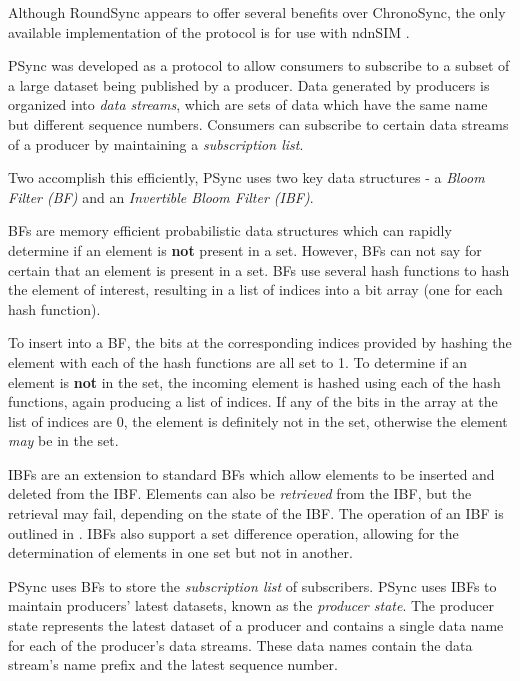 Although RoundSync appears to offer several benefits over ChronoSync, the only available implementation of the protocol is for use with ndnSIM \cite{roundsync-github}.

PSync was developed as a protocol to allow consumers to subscribe to a subset of a large dataset being published by a producer. Data generated by producers is organized into \textit{data streams}, which are sets of data which have the same name but different sequence numbers. Consumers can subscribe to certain data streams of a producer by maintaining a \textit{subscription list}.

Two accomplish this efficiently, PSync uses two key data structures - a \textit{Bloom Filter (BF)} and an \textit{Invertible Bloom Filter (IBF)}. 

BFs are memory efficient probabilistic data structures which can rapidly determine if an element is \textbf{not} present in a set. However, BFs can not say for certain that an element is present in a set. BFs use several hash functions to hash the element of interest, resulting in a list of indices into a bit array (one for each hash function). 

To insert into a BF, the bits at the corresponding indices provided by hashing the element with each of the hash functions are all set to 1. To determine if an element is \textbf{not} in the set, the incoming element is hashed using each of the hash functions, again producing a list of indices. If any of the bits in the array at the list of indices are 0, the element is definitely not in the set, otherwise the element \textit{may} be in the set. 

IBFs are an extension to standard BFs which allow elements to be inserted and deleted from the IBF. Elements can also be \textit{retrieved} from the IBF, but the retrieval may fail, depending on the state of the IBF. The operation of an IBF is outlined in . IBFs also support a set difference operation, allowing for the determination of elements in one set but not in another. 

PSync uses BFs to store the \textit{subscription list} of subscribers. PSync uses IBFs to maintain producers' latest datasets, known as the \textit{producer state}. The producer state represents the latest dataset of a producer and contains a single data name for each of the producer's data streams. These data names contain the data stream's name prefix and the latest sequence number.  

